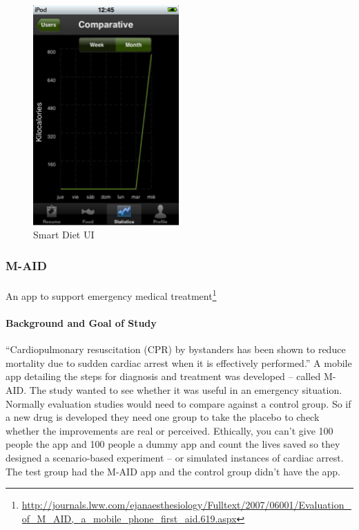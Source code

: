 \documentclass[12pt, a4paper, twoside]{book}
\begin{document}
\begin{figure}[H]
\centering
\includegraphics[width=0.5\textwidth]{images/smart-diet-2}
\caption{Smart Diet UI}
\label{fig:smart-diet-2}
\end{figure}

\subsubsection{M-AID}

\paragraph{} An app to support emergency medical treatment\footnote{\url{http://journals.lww.com/ejanaesthesiology/Fulltext/2007/06001/Evaluation_of_M_AID,_a_mobile_phone_first_aid.619.aspx}}

\paragraph{Background and Goal of Study} ``Cardiopulmonary resuscitation (CPR) by bystanders has been shown to reduce mortality due to sudden cardiac arrest when it is effectively performed.'' A mobile app detailing the steps for diagnosis and treatment was developed – called M-AID. The study wanted to see whether it was useful in an emergency situation.
Normally evaluation studies would need to compare against a control group. So if a new drug is developed they need one group to take the placebo to check whether the improvements are real or perceived.
Ethically, you can’t give 100 people the app and 100 people a dummy app and count the lives saved so they designed a scenario-based experiment – or simulated instances of cardiac arrest. The test group had the M-AID app and the control group didn’t have the app.
\end{document}
